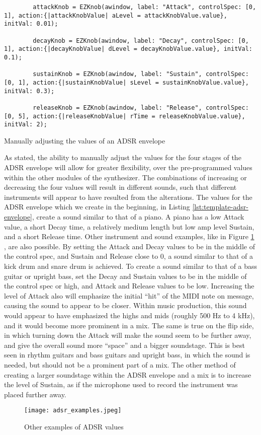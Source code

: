 \begin{listing}
	\begin{lstlisting}
		attackKnob = EZKnob(awindow, label: "Attack", controlSpec: [0, 1], action:{|attackKnobValue| aLevel = attackKnobValue.value}, initVal: 0.01);

		decayKnob = EZKnob(awindow, label: "Decay", controlSpec: [0, 1], action:{|decayKnobValue| dLevel = decayKnobValue.value}, initVal: 0.1);

		sustainKnob = EZKnob(awindow, label: "Sustain", controlSpec: [0, 1], action:{|sustainKnobValue| sLevel = sustainKnobValue.value}, initVal: 0.3);

		releaseKnob = EZKnob(awindow, label: "Release", controlSpec: [0, 5], action:{|releaseKnobValue| rTime = releaseKnobValue.value}, initVal: 2);
	\end{lstlisting}	
	\caption{Manually adjusting the values of an ADSR envelope}
	\label{lst:midi-adsr-manual}
\end{listing}

As stated, the ability to manually adjust the values for the four stages of the ADSR envelope will allow for greater flexibility, over the pre-programmed values within the other modules of the synthesizer. The combinations of increasing or decreasing the four values will result in different sounds, such that different instruments will appear to have resulted from the alterations. The values for the ADSR envelope which we create in the beginning, in Listing \ref{lst:template-adsr-envelope}, create a sound similar to that of a piano. A piano has a low Attack value, a short Decay time, a relatively medium length but low amp level Sustain, and a short Release time. Other instrument and sound examples, like in Figure \ref{fig:adsr-examples} \cite{Swisher_2019}, are also possible. By setting the Attack and Decay values to be in the middle of the control spec, and Sustain and Release close to 0, a sound similar to that of a kick drum and snare drum is achieved. To create a sound similar to that of a bass guitar or upright bass, set the Decay and Sustain values to be in the middle of the control spec or high, and Attack and Release values to be low. Increasing the level of Attack also will emphasize the initial ``hit'' of the MIDI note on message, causing the sound to appear to be closer. Within music production, this sound would appear to have emphasized the highs and mids (roughly 500 Hz to 4 kHz), and it would become more prominent in a mix. The same is true on the flip side, in which turning down the Attack will make the sound seem to be further away, and give the overall sound more ``space'' and a bigger soundstage. This is best seen in rhythm guitars and bass guitars and upright bass, in which the sound is needed, but should not be a prominent part of a mix. The other method of creating a larger soundstage within the ADSR envelope and a mix is to increase the level of Sustain, as if the microphone used to record the instrument was placed further away. 

\begin{figure}
  \centering
  \texttt{[image: adsr\_examples.jpeg]}
  \caption{Other examples of ADSR values} \cite{Swisher_2019}
  \label{fig:adsr-examples}
\end{figure}